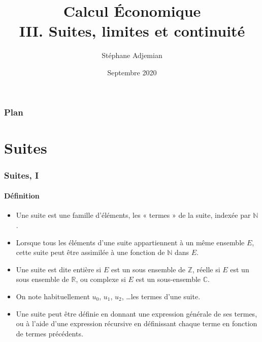 \documentclass[10pt,notheorems]{beamer}
\theoremstyle{plain}
\theoremstyle{definition} %
\begin{document}
\title{Calcul Économique\\\small{III. Suites, limites et continuité}}
\author[S. Adjemian]{Stéphane Adjemian}
 \date{Septembre 2020}

\begin{frame}
  \titlepage{}
\end{frame}

\begin{frame}
  \frametitle{Plan}
  \tableofcontents
\end{frame}


\section{Suites}

\begin{frame}
  \frametitle{Suites, I}
  \framesubtitle{Définition}
  \hypertarget{slide_suites_1}{}

  \begin{itemize}

  \item Une suite est une famille d'éléments, les « termes » de la suite, indexée par $\mathbb N$.\newline

  \item Lorsque tous les éléments d'une suite appartiennent à un même ensemble $E$, cette suite peut être assimilée à une fonction de $\mathbb N$ dans $E$.\newline

  \item Une suite est dite entière si $E$ est un sous ensemble de $\mathbb Z$, réelle si $E$ est un sous ensemble de $\mathbb R$, ou complexe si $E$ est un sous-ensemble $\mathbb C$.\newline

  \item On note habituellement $u_0$, $u_1$, $u_2$, \ldots les termes d'une suite.\newline

  \item Une suite peut être définie en donnant une expression générale de ses termes, ou à l'aide d'une expression récursive en définissant chaque terme en fonction de termes précédents.\newline

  \end{itemize}

\end{frame}
\end{document}
